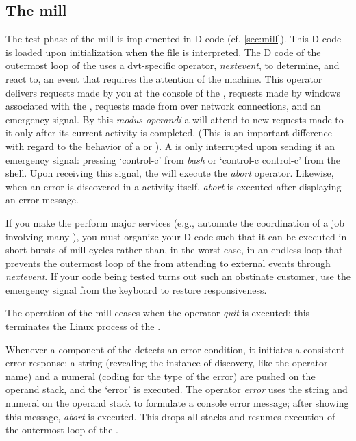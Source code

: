 \subsection{The  mill}

The test phase of the  mill is implemented in D code
(cf. \ref{sec:mill}). This D code is loaded upon initialization when
the file  is interpreted. The D code of the outermost
loop of the  uses a dvt-specific operator, \emph{nextevent},
to determine, and react to, an event that requires the attention of
the machine. This operator delivers requests made by you at the
console of the , requests made by windows associated with
the , requests made from  over network
connections, and an emergency signal. By this \emph{modus operandi} a
 will attend to new requests made to it only after its
current activity is completed. (This is an important difference with
regard to the behavior of a  or ). A
 is only interrupted upon sending it an emergency signal:
pressing `control-c' from \emph{bash} or `control-c control-c' from
the  shell. Upon receiving this signal, the 
will execute the \emph{abort} operator. Likewise, when an error is
discovered in a  activity itself, \emph{abort} is executed
after displaying an error message.

If you make the  perform major services (e.g., automate the
coordination of a job involving many ), you must organize
your D code such that it can be executed in short bursts of mill
cycles rather than, in the worst case, in an endless loop that
prevents the outermost loop of the  from attending to
external events through \emph{nextevent}. If your  code
being tested turns out such an obstinate customer, use the emergency
signal from the keyboard to restore  responsiveness.

The operation of the  mill ceases when the operator
\emph{quit} is executed; this terminates the Linux process of the
.

Whenever a component of the  detects an error condition, it
initiates a consistent error response: a string (revealing the
instance of discovery, like the operator name) and a numeral (coding
for the type of the error) are pushed on the operand stack, and the
`error' is executed. The operator \emph{error} uses the string and
numeral on the operand stack to formulate a console error message;
after showing this message, \emph{abort} is executed. This drops all
stacks and resumes execution of the outermost loop of the .



